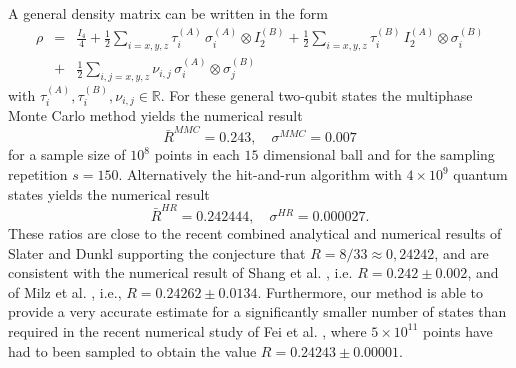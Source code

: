 \documentclass[12pt]{iopart}
\begin{document}
A general density matrix can be written in the form
\begin{eqnarray}
\rho &=& \frac{I_4}{4} +\frac{1}{2} 
 \sum_{i=x,y,z} \tau^{(A)}_i \,\sigma^{(A)}_i  \otimes I^{(B)}_2
+ \frac{1}{2} \sum_{i=x,y,z} \tau^{(B)}_i \,I^{(A)}_2 \otimes \sigma^{(B)}_i \nonumber\\
&+&
\frac{1}{2} \sum_{i,j=x,y,z} \nu_{i,j} \,\sigma^{(A)}_i  \otimes  \sigma^{(B)}_j
\label{full}
\end{eqnarray}
with $\tau^{(A)}_i,\tau^{(B)}_i,\nu_{i,j}\in \mathbb{R}$.
For these general two-qubit states the multiphase Monte Carlo method yields the numerical result 
\begin{equation}
 \bar{R}^{MMC}=0.243, \quad \sigma^{MMC}=0.007
\end{equation}
for a sample size of $10^8$ points in each $15$ dimensional ball and for the sampling repetition $s=150$. Alternatively the hit-and-run algorithm with $4 \times 10^9$ quantum states yields the numerical result
\begin{equation}
 \bar{R}^{HR}=0.242444, \quad \sigma^{HR}=0.000027. 
\end{equation}
These ratios are close to the recent combined analytical and numerical results of Slater and Dunkl \cite{Slater3} supporting the conjecture that $R=8/33\approx 0,24242$, and are consistent with the numerical result of 
Shang et al. \cite{Shang}, i.e. $R=0.242 \pm 0.002$, and of Milz et al. \cite{Milz}, i.e., $R=0.24262 \pm 0.0134$. Furthermore, our method is able to provide a very accurate estimate for a significantly smaller number of states than required in the recent
numerical study of Fei et al. \cite{Fei}, where $5 \times 10^{11}$ points have had to been sampled to obtain the value $R = 0.24243 \pm 0.00001$.
\end{document}
